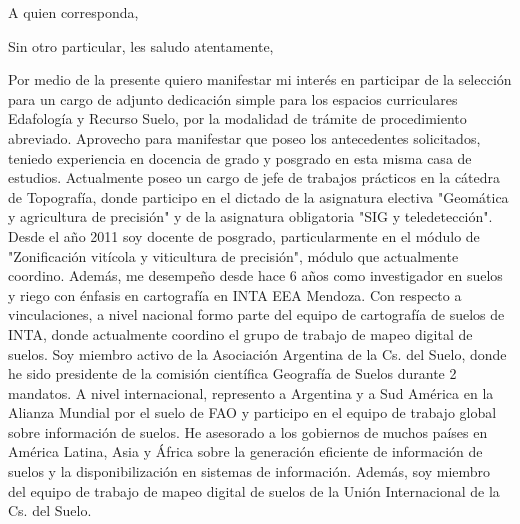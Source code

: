 \documentclass[11pt,a4paper,sans]{moderncv}
\begin{document}
	



\clearpage

\date{\today} %
\opening{A quien corresponda,} %
\closing{Sin otro particular, les saludo atentamente,} %

\makelettertitle %

Por medio de la presente quiero manifestar mi interés en participar de la selección para un cargo de adjunto dedicación simple para los espacios curriculares Edafología y Recurso Suelo, por la modalidad de trámite de procedimiento abreviado. Aprovecho para manifestar que poseo los antecedentes solicitados, teniedo experiencia en docencia de grado y posgrado en esta misma casa de estudios. Actualmente poseo un cargo de jefe de trabajos prácticos en la cátedra de Topografía, donde participo en el dictado de la asignatura electiva "Geomática y agricultura de precisión" y de la asignatura obligatoria "SIG y teledetección". Desde el año 2011 soy docente de posgrado, particularmente en el módulo de "Zonificación vitícola y viticultura de precisión", módulo que actualmente coordino. Además, me desempeño desde hace 6 años como investigador en suelos y riego con énfasis en cartografía en INTA EEA Mendoza. Con respecto a vinculaciones, a nivel nacional formo parte del equipo de cartografía de suelos de INTA, donde actualmente coordino el grupo de trabajo de mapeo digital de suelos. Soy miembro activo de la Asociación Argentina de la Cs. del Suelo, donde he sido presidente de la comisión científica Geografía de Suelos durante 2 mandatos. A nivel internacional, represento a Argentina y a Sud América en la Alianza Mundial por el suelo de FAO y participo en el equipo de trabajo global sobre información de suelos. He asesorado a los gobiernos de muchos países en América Latina, Asia y África sobre la generación eficiente de información de suelos y la disponibilización en sistemas de información. Además, soy miembro del equipo de trabajo de mapeo digital de suelos de la Unión Internacional de la Cs. del Suelo.
\end{document}
